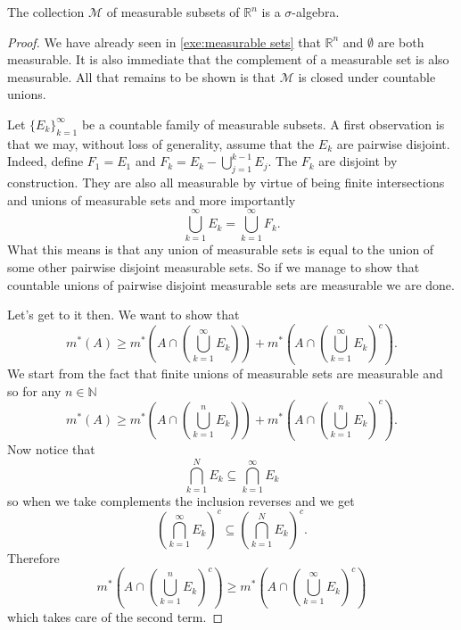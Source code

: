 \documentclass[12pt,oneside]{book}
\numberwithin{table}{section}
\numberwithin{equation}{section}
\numberwithin{figure}{section}
\newcommand{\R}{\mathbb{R}}
\newcommand{\N}{\mathbb{N}}
\newcommand{\M}{\mathcal{M}}
\newcommand{\ext}[1]{m^* \! \left( #1 \right)}
\begin{document}
\begin{proposition}
	The collection \( \M \) of measurable subsets of \( \R^n \) is a \( \sigma \)-algebra.
\end{proposition}
\begin{proof}
	We have already seen in \cref{exe:measurable sets} that \( \R^n \) and \( \emptyset \) are both measurable. It is also immediate that the complement of a measurable set is also measurable. All that remains to be shown is that \( \M \) is closed under countable unions. 

	Let \( \{ E_k \}_{k = 1}^\infty \) be a countable family of measurable subsets. A first observation is that we may, without loss of generality, assume that the \( E_k \) are pairwise disjoint. Indeed, define \( F_1 = E_1 \) and \( F_k = E_{k} - \bigcup_{j = 1}^{k-1}E_j \). The \( F_k \) are disjoint by construction. They are also all measurable by virtue of being finite intersections and unions of measurable sets and more importantly
	\begin{equation*}
		\bigcup_{k = 1}^\infty E_k = \bigcup_{k = 1}^\infty	F_k.
	\end{equation*}
	What this means is that any union of measurable sets is equal to the union of some other pairwise disjoint measurable sets. So if we manage to show that countable unions of pairwise disjoint measurable sets are measurable we are done. 

	Let's get to it then. We want to show that
	\begin{equation*}
		\ext{A} \geq \ext{A \cap \left(\bigcup_{k = 1}^\infty E_k\right)} + \ext{A \cap \left(\bigcup_{k = 1}^\infty E_k\right)^c}.
	\end{equation*}
	We start from the fact that finite unions of measurable sets are measurable and so for any \( n \in \N \)
	\begin{equation*}
		\ext{A} \geq \ext{A \cap \left(\bigcup_{k = 1}^n E_k\right)} + \ext{A \cap \left(\bigcup_{k = 1}^n E_k\right)^c}.
	\end{equation*}
	Now notice that 	
	\begin{equation*}
		\bigcap_{k = 1}^N E_k \subseteq \bigcap_{k = 1}^\infty E_k
	\end{equation*}
	so when we take complements the inclusion reverses and we get
	\begin{equation*}
		\left(\bigcap_{k = 1}^\infty E_k\right)^c \subseteq \left(\bigcap_{k = 1}^N E_k\right)^c.
	\end{equation*}
	Therefore
	\begin{equation*}
		\ext{A \cap \left(\bigcup_{k = 1}^n E_k\right)^c} \geq \ext{A \cap \left(\bigcup_{k = 1}^\infty E_k\right)^c}
	\end{equation*}
	which takes care of the second term.


\end{proof}
\end{document}

